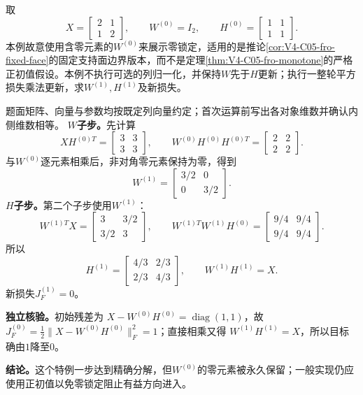 \label{struct:V4-C05-CH32}
\begin{example}[一次平方NMF顺序更新]\label{exm:V4-C05-one-nmf-step}
取
\[
X=\begin{bmatrix}2&1\\1&2\end{bmatrix},\qquad
W^{(0)}=I_2,\qquad
H^{(0)}=\begin{bmatrix}1&1\\1&1\end{bmatrix}.
\]
本例故意使用含零元素的$W^{(0)}$来展示零锁定，适用的是推论\ref{cor:V4-C05-fro-fixed-face}的固定支持面边界版本，而不是定理\ref{thm:V4-C05-fro-monotone}的严格正初值假设。本例不执行可选的列归一化，并保持$W$先于$H$更新；执行一整轮平方损失乘法更新，求$W^{(1)},H^{(1)}$及新损失。

\label{struct:V4-C05-CH33}
\end{example}
\begin{solution}
\SolGiven 题面矩阵、向量与参数均按既定列向量约定；首次运算前写出各对象维数并确认内侧维数相等。
\SolDerive
\textbf{$W$子步。}先计算
\[
XH^{(0)T}=\begin{bmatrix}3&3\\3&3\end{bmatrix},
\qquad
W^{(0)}H^{(0)}H^{(0)T}
=\begin{bmatrix}2&2\\2&2\end{bmatrix}.
\]
与$W^{(0)}$逐元素相乘后，非对角零元素保持为零，得到
\[
W^{(1)}=\begin{bmatrix}3/2&0\\0&3/2\end{bmatrix}.
\]
\textbf{$H$子步。}第二个子步使用$W^{(1)}$：
\[
W^{(1)T}X=
\begin{bmatrix}3&3/2\\3/2&3\end{bmatrix},
\qquad
W^{(1)T}W^{(1)}H^{(0)}=
\begin{bmatrix}9/4&9/4\\9/4&9/4\end{bmatrix}.
\]
所以
\[
H^{(1)}=\begin{bmatrix}4/3&2/3\\2/3&4/3\end{bmatrix},
\qquad W^{(1)}H^{(1)}=X.
\]
新损失$J_F^{(1)}=0$。

\textbf{独立核验。}初始残差为
$X-W^{(0)}H^{(0)}=\operatorname{diag}(1,1)$，故
$J_F^{(0)}=\tfrac12\|X-W^{(0)}H^{(0)}\|_F^2=1$；直接相乘又得
$W^{(1)}H^{(1)}=X$，所以目标确由$1$降至$0$。

\textbf{结论。}这个特例一步达到精确分解，但$W^{(0)}$的零元素被永久保留；一般实现仍应使用正初值以免零锁定阻止有益方向进入。
\end{solution}

